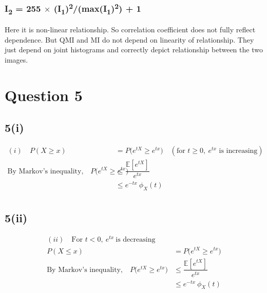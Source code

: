 \documentclass[12pt]{article}
\begin{document}
\subsubsection{I\textsubscript{2} = 255 $\times$ (I\textsubscript{1})\textsuperscript{2}/(max(I\textsubscript{1})\textsuperscript{2}) + 1}
Here it is non-linear relationship. So correlation coefficient does not fully reflect dependence. But QMI and MI do not depend on linearity of relationship. They just depend on joint histograms and correctly depict relationship between the two images.

\section{Question 5}
\subsection{5(i)}
\begin{align*}
(i) \quad P(X \geq x) &= P\big(e^{tX} \geq e^{tx}\big) \quad (\text{for } t \geq 0, \ e^{tx} \text{ is increasing}) \\
\text{By Markov's inequality,} \quad 
P\big(e^{tX} \geq e^{tx}\big) &\leq \dfrac{\mathbb{E}[e^{tX}]}{e^{tx}} \\
&\leq e^{-tx} \ \phi_X(t) \\[6pt]
\end{align*}
\subsection{5(ii)}
\begin{align*}
(ii) \quad \text{For } t < 0, \ e^{tx} \ \text{is decreasing} \\
P(X \leq x) &= P\big(e^{tX} \geq e^{tx}\big) \\
\text{By Markov's inequality,} \quad 
P\big(e^{tX} \geq e^{tx}\big) &\leq \dfrac{\mathbb{E}[e^{tX}]}{e^{tx}} \\
&\leq e^{-tx} \ \phi_X(t) \\[6pt]
\end{align*}
\end{document}
